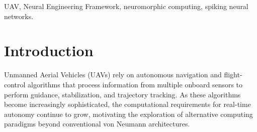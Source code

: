 \documentclass[conference]{IEEEtran}
\begin{document}
\begin{abstract}
Neuromorphic processors offer a promising path toward energy-efficient autonomous flight, but their practical adoption requires translating conventional flight-control algorithms into spiking neural networks (SNNs) while preserving closed-loop performance. This paper presents a neuromorphic flight-control architecture for a coaxial Hexarotor UAV based on the Neural Engineering Framework (NEF). Both the vehicle dynamics and the cascade flight controller are implemented as recurrent SNNs in the Nengo simulator. The Hexarotor dynamics are decomposed into altitude, longitudinal, lateral, and directional subsystems, while the controller employs PID regulation in the outer translational loops and PD regulation in the inner attitude loops. Performance is evaluated in a 60 s trajectory-tracking mission against an equivalent classic implementation of the same control architecture. The SNN-based controller achieves correlation coefficients exceeding 0.99 and sub-decimeter RMS position-tracking errors, demonstrating close agreement with the conventional controller. %
\end{abstract}

\begin{IEEEkeywords}
UAV, Neural Engineering Framework, neuromorphic computing, spiking neural networks.
\end{IEEEkeywords}

\section{Introduction}\label{intro}

Unmanned Aerial Vehicles (UAVs) rely on autonomous navigation and flight-control algorithms that process information from multiple onboard sensors to perform guidance, stabilization, and trajectory tracking. As these algorithms become increasingly sophisticated, the computational requirements for real-time autonomy continue to grow, motivating the exploration of alternative computing paradigms beyond conventional von Neumann architectures.
\end{document}
